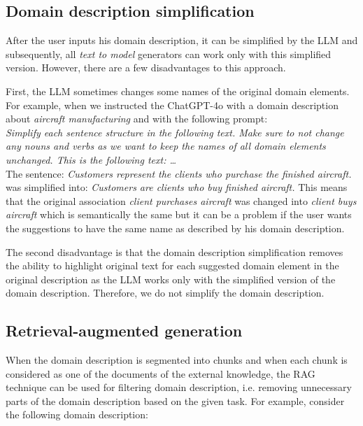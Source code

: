 \subsection{Domain description simplification}

After the user inputs his domain description, it can be simplified by the LLM and subsequently, all \emph{text to model} generators can work only with this simplified version. However, there are a few disadvantages to this approach.

First, the LLM sometimes changes some names of the original domain elements. For example, when we instructed the ChatGPT-4o with a domain description about \emph{aircraft manufacturing} and with the following prompt: \\

\noindent{}\textit{Simplify each sentence structure in the following text. Make sure to not change any nouns and verbs as we want to keep the names of all domain elements unchanged. This is the following text: \ldots} \\

\noindent{}The sentence: \textit{Customers represent the clients who purchase the finished aircraft.} was simplified into: \textit{Customers are clients who buy finished aircraft.} This means that the original association \textit{client purchases aircraft} was changed into \textit{client buys aircraft} which is semantically the same but it can be a problem if the user wants the suggestions to have the same name as described by his domain description.

The second disadvantage is that the domain description simplification removes the ability to highlight original text for each suggested domain element in the original description as the LLM works only with the simplified version of the domain description. Therefore, we do not simplify the domain description.


\subsection{Retrieval-augmented generation}

When the domain description is segmented into chunks and when each chunk is considered as one of the documents of the external knowledge, the RAG technique can be used for filtering domain description, i.e. removing unnecessary parts of the domain description based on the given task. For example, consider the following domain description: \\

